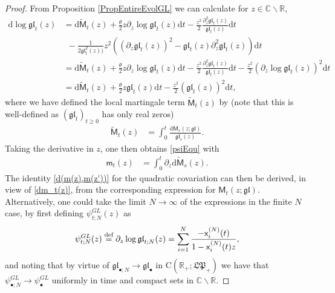 \documentclass[]{article}
\begin{document}
\begin{proof}
From Proposition \ref{PropEntireEvolGL} we can calculate for $z\in \mathbb{C}\backslash \mathbb{R}$,
\begin{align}\label{dlog phi}
    \mathrm{d}
\log\mathfrak{gl}_t(z)
&=
 \mathrm{d}\widetilde{\mathsf{M}}_t(z)
+
    \frac{\theta}{2}z\partial_z
    \log
    \mathfrak{gl}_t(z)\mathrm{d}t
  -
    \frac{z^2}{2}
    \frac{\partial_{z}^2\mathfrak{gl}_t(z)}{\mathfrak{gl}_t(z)}\mathrm{d}t
   \nonumber
   \\
  & \  \ -\frac{1}{2\mathfrak{gl}_t^2(z))}
    z^2\left(\left(\partial_z\mathfrak{gl}_t(z)\right)^2
-
\mathfrak{gl}_t(z)
\partial_{z}^2\mathfrak{gl}_t(z)
\right)\mathrm{d}t
\nonumber
\\
&=
\mathrm{d}\widetilde{\mathsf{M}}_t(z)
+
    \frac{\theta}{2}z\partial_z
    \log
    \mathfrak{gl}_t(z)\mathrm{d}t
-
    \frac{z^2}{2}\frac{\partial_{z}^2\mathfrak{gl}_t(z)}{\mathfrak{gl}_t(z)}\mathrm{d}t
   -\frac{z^2}{2}
    \left(\partial_z\log
    \mathfrak{gl}_t(z)\right)^2\mathrm{d}t
    \nonumber
    \\
    &=
    \mathrm{d}\widetilde{\mathsf{M}}_t(z)
    +\frac{\theta}{2}z\mathfrak{gl}_t(z)\mathrm{d}t
    -
    \frac{z^2}{2}\left(\mathfrak{gl}_t(z)\right)^2\mathrm{d}t,
\end{align}
where we have defined the local martingale term $\widetilde{\mathsf{M}}_t(z)$ by (note that this is well-defined as $(\mathfrak{gl}_t)_{t\ge 0}$ has only real zeros)
\begin{align*}
\widetilde{\mathsf{M}}_t(z)
&=
\int_0^t\frac{\mathrm{d}\mathsf{M}_s(z;\mathfrak{gl})}{\mathfrak{gl}_{s}(z)}.
\end{align*}
Taking the derivative in $z$, one then obtains \eqref{psiEqu} with 
\begin{align}\label{dm_t(z)}
\mathsf{m}_t\left(z\right)
&=\int_0^t\partial_z\mathrm{d}\widetilde{\mathsf{M}}_s(z).
\end{align}
The identity \eqref{d(m(z),m(z'))} for the quadratic covariation 
can then be derived, in view of \eqref{dm_t(z)}, from the corresponding expression for $\mathsf{M}_t(z;\mathfrak{gl})$.
Alternatively, one could 
take the limit $N\to\infty$ of the expressions in the finite $N$ case, by first defining $\psi_{t;N}^{GL}(z)$ as
\begin{align*}
     \psi_{t;N}^{GL}(z)
    \overset{\textnormal{def}}{=}
\partial_z
\log\mathfrak{gl}_{t;N}(z)
=
\sum_{i=1}^N
\frac{-\mathsf{x}_i^{(N)}(t)}{1-\mathsf{x}_i^{(N)}(t)z},
\end{align*}
and  noting that by virtue of $\mathfrak{gl}_{\bullet;N} \to \mathfrak{gl}_{\bullet}$ in $\mathrm{C}(\mathbb{R}_+;\mathfrak{LP}_+)$ we have that $ \psi_{\bullet;N}^{GL}\to\psi_\bullet^{GL}$ uniformly in time and compact sets in $\mathbb{C}\backslash \mathbb{R}$.
\end{proof}
\end{document}

